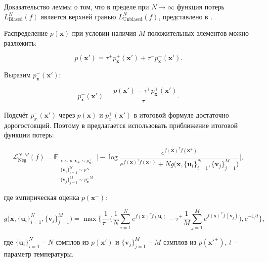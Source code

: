 \documentclass[a4paper, 14pt]{article}
\begin{document}
Доказательство леммы о том, что в пределе при $N \to \infty$ функция потерь $L_{\text{Biased}}^N(f)$ является верхней гранью $L_{\text{Unbiased}}^N(f)$, представлено в \citep{chuang2020debiased}.

Распределение $p(\mathbf{x})$ при условии наличия $M$ положительных элементов можно разложить:

\begin{equation}\label{eq:3}
p(\textbf{x}') = \tau^+ p^+_\mathbf{x}(\textbf{x}') + \tau^-p_\mathbf{x}^-(\textbf{x}').
\end{equation}

Выразим $p^-_\mathbf{x}(\textbf{x}')$:

\begin{equation} \label{eq:4}
p_\mathbf{x}^-(\textbf{x}') = \frac{p(\textbf{x}') - \tau^+ p^+_\mathbf{x}(\textbf{x}')}{\tau^-}.
\end{equation}

Подсчёт $p^-_x(\textbf{x}')$ через $p(\mathbf{x})$ и $p^+_x(\textbf{x}')$ в итоговой формуле достаточно дорогостоящий. Поэтому в \citep{chuang2020debiased} предлагается использовать приближение итоговой функции потерь:

\begin{equation}\label{eq:5}
\mathcal{L}_{\text{Neg}}^{N, M}(f) = \mathbb{E}_{\substack{\textbf{x} \sim p; \textbf{x}_+ \sim p_\mathbf{x}^+,\\ \{\textbf{u}_i\}_{i=1}^N \sim p^N \\ \{\textbf{v}_j\}_{j=1}^M \sim {p_\mathbf{x}^+}^M}}  \bigg[ -\log \frac{e^{f(\textbf{x})^T f(\textbf{x}^+)} }{e^{f(\textbf{x})^T f(\textbf{x}^+)} + N g\big(\textbf{x}, \{\textbf{u}_i\}_{i=1}^N, \{\textbf{v}_j\}_{j=1}^M\big)} \bigg],
\end{equation}

\noindent где эмпирическая оценка $p(\mathbf{x}^-)$:

\begin{equation}\label{eq:6}
g\big(\textbf{x}, \{\textbf{u}_i\}_{i=1}^N, \{\textbf{v}_j\}_{j=1}^M\big) = \max \bigg\{ \frac{1}{\tau^-}\bigg(\frac{1}{N} \sum \limits_{i=1}^N e^{f(\textbf{x})^T f(\textbf{u}_i)} - \tau^+ \frac{1}{M} \sum \limits_{j=1}^M e^{f(\textbf{x})^T f(\textbf{v}_j)}\bigg), e^{-1/t}\bigg\},
\end{equation}

\noindent где $\{\textbf{u}_i\}_{i=1}^N$ -- $N$ сэмплов из $p(\mathbf{x'})$ и $\{\textbf{v}_j\}_{j=1}^M$ -- $M$ сэмплов из $p(\mathbf{x'}^+)$, $t$ -- параметр температуры.
\end{document}
